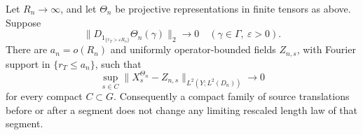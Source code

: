 \begin{lemma}\label{lem:ray-compactshort}
Let \(R_n\to\infty\), and let \(\Theta_n\) be projective
representations in finite tensors as above.  Suppose
\begin{equation}
 \|D_{1_{\{r_T>\varepsilon R_n\}}}\Theta_n(\gamma)\|_2\longrightarrow0
 \quad(\gamma\in\Gamma,\ \varepsilon>0).
 \label{eq:ray-short-fixed}
\end{equation}
There are \(a_n=o(R_n)\) and uniformly operator-bounded fields
\(Z_{n,s}\), with Fourier support in \(\{r_T\le a_n\}\), such that
\begin{equation}
 \sup_{s\in C}\|X^{\Theta_n}_s-Z_{n,s}\|_{L^2(Y;L^2(D_n))}
 \longrightarrow0
 \label{eq:ray-short-compact}
\end{equation}
for every compact \(C\subset G\).  Consequently a compact family of
source translations before or after a segment does not change any
limiting rescaled length law of that segment.
\end{lemma}

